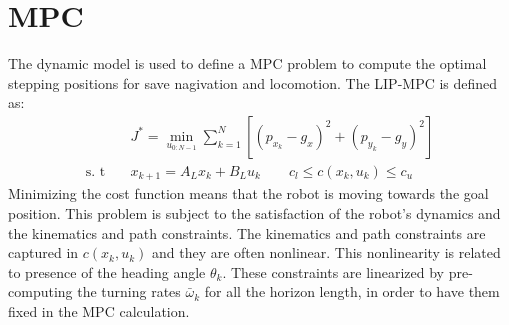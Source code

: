\documentclass[main.tex]{subfiles}
\begin{document}
\section{MPC}\label{sec:mpc}

The dynamic model is used to define a MPC problem to compute the optimal stepping positions for save nagivation and locomotion. The LIP-MPC is defined as:
\begin{align*}
    &J^* = \min_{u_{0:N-1}} \sum_{k=1}^{N}[(p_{x_{k}} - g_{x})^2+(p_{y_{k}} - g_{y})^2]
    \\ \text{s. t} \quad
    &x_{k+1} = A_{L}x_{k} + B_{L}u_{k} \qquad
    c_{l} \le c(x_{k}, u_{k}) \le c_{u}
\end{align*}
Minimizing the cost function means that the robot is moving towards the goal position. This problem is subject to the satisfaction of the robot's dynamics and the kinematics and path constraints. The kinematics and path constraints are captured in $c(x_{k}, u_{k})$ and they are often nonlinear. This nonlinearity is related to presence of the heading angle $\theta_{k}$. These constraints are linearized by pre-computing the turning rates $\bar{\omega}_{k}$ for all the horizon length, in order to have them fixed in the MPC calculation.
\end{document}

